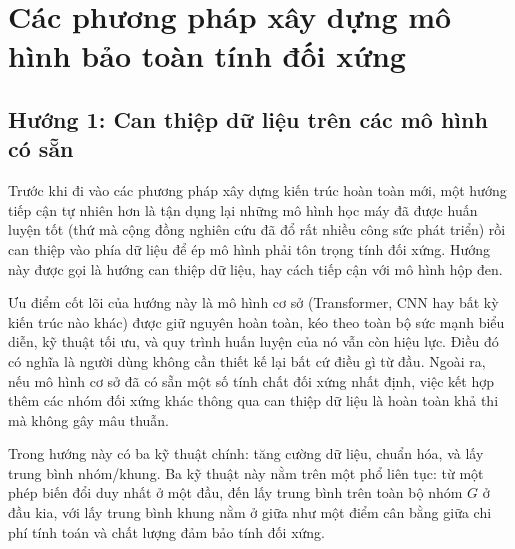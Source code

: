 \section{Các phương pháp xây dựng mô hình bảo toàn tính đối xứng}
\label{sec:phuong-phap}



\subsection{Hướng 1: Can thiệp dữ liệu trên các mô hình có sẵn}
\label{subsec:off-the-shelf}

Trước khi đi vào các phương pháp xây dựng kiến trúc hoàn toàn mới, một hướng tiếp cận tự nhiên hơn là tận dụng lại những mô hình học máy đã được huấn luyện tốt (thứ mà cộng đồng nghiên cứu đã đổ rất nhiều công sức phát triển) rồi can thiệp vào phía dữ liệu để ép mô hình phải tôn trọng tính đối xứng. Hướng này được gọi là hướng can thiệp dữ liệu, hay cách tiếp cận với mô hình hộp đen.

Ưu điểm cốt lõi của hướng này là mô hình cơ sở (Transformer, CNN hay bất kỳ kiến trúc nào khác) được giữ nguyên hoàn toàn, kéo theo toàn bộ sức mạnh biểu diễn, kỹ thuật tối ưu, và quy trình huấn luyện của nó vẫn còn hiệu lực. Điều đó có nghĩa là người dùng không cần thiết kế lại bất cứ điều gì từ đầu. Ngoài ra, nếu mô hình cơ sở đã có sẵn một số tính chất đối xứng nhất định, việc kết hợp thêm các nhóm đối xứng khác thông qua can thiệp dữ liệu là hoàn toàn khả thi mà không gây mâu thuẫn.

Trong hướng này có ba kỹ thuật chính: tăng cường dữ liệu, chuẩn hóa, và lấy trung bình nhóm/khung. Ba kỹ thuật này nằm trên một phổ liên tục: từ một phép biến đổi duy nhất ở một đầu, đến lấy trung bình trên toàn bộ nhóm $G$ ở đầu kia, với lấy trung bình khung nằm ở giữa như một điểm cân bằng giữa chi phí tính toán và chất lượng đảm bảo tính đối xứng.

